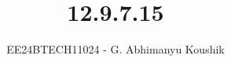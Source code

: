 \documentclass[journal]{IEEEtran}
\begin{document}

\vspace{3cm}

\title{12.9.7.15}
\author{EE24BTECH11024 - G. Abhimanyu Koushik}
{\let\newpage\relax\maketitle}

\renewcommand{\thefigure}{\theenumi}
\renewcommand{\thetable}{\theenumi}
\setlength{\intextsep}{10pt} %


\renewcommand{\thetable}{\theenumi}
\end{document}
